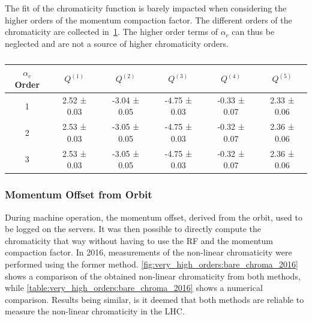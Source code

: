 The fit of the chromaticity function is barely impacted when considering the higher orders of the 
momentum compaction factor. The different orders of the chromaticity are collected
in~\cref{table:decapoles:chromaticity:alpha_c_chroma}.
The higher order terms of $\alpha_c$ can thus be neglected and are not a source of higher
chromaticity orders.

\begin{table}[tbh]
    \begin{tabular}{c|ccccc}
        $\alpha_c$ Order & $Q^{(1)}$ & $Q^{(2)}$ & $Q^{(3)}$ & $Q^{(4)}$ & $Q^{(5)}$\\
        \hline
        1 & 2.52 ± 0.03 & -3.04 ± 0.05 & -4.75 ± 0.03 & -0.33 ± 0.07 & 2.33 ± 0.06 \\
        2 & 2.53 ± 0.03 & -3.05 ± 0.05 & -4.75 ± 0.03 & -0.32 ± 0.07 & 2.36 ± 0.06 \\
        3 & 2.53 ± 0.03 & -3.05 ± 0.05 & -4.75 ± 0.03 & -0.32 ± 0.07 & 2.36 ± 0.06 \\
        \end{tabular}
    \caption{}
    \label{table:decapoles:chromaticity:alpha_c_chroma}
\end{table}



\subsubsection{Momentum Offset from Orbit}

During machine operation, the momentum offset, derived from the orbit, used to be logged on the
servers. It was then possible to directly compute the chromaticity that way without having to use
the RF and the momentum compaction factor.
In 2016, measurements of the non-linear chromaticity were performed using the former method.
\cref{fig:very_high_orders:bare_chroma_2016} shows a comparison of the obtained non-linear 
chromaticity from both methods, while \cref{table:very_high_orders:bare_chroma_2016} shows a
numerical comparison. Results being similar, is it deemed that both methods are reliable to measure
the non-linear chromaticity in the LHC.

